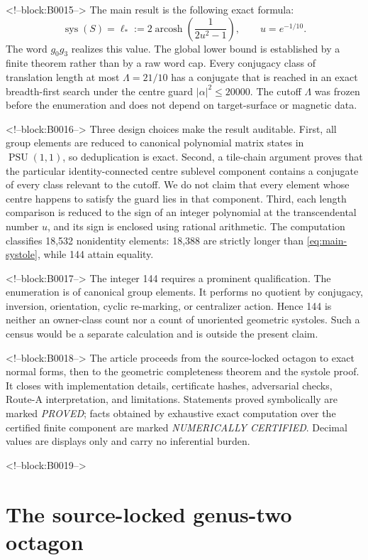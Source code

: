 \documentclass[11pt,a4paper]{article}
\theoremstyle{definition}
\newcommand{\PSU}{\operatorname{PSU}}
\newcommand{\arcosh}{\operatorname{arcosh}}
\newcommand{\sys}{\operatorname{sys}}
\newcommand{\length}{\ell}
\begin{document}
<!--block:B0015-->
The main result is the following exact formula:
\begin{equation}\label{eq:main-systole}
 \sys(S)=\length_*
 :=2\arcosh\!\left(\frac{1}{2u^2-1}\right),
 \qquad u=e^{-1/10}.
\end{equation}
The word \(g_0g_3\) realizes this value.  The global lower bound is established
by a finite theorem rather than by a raw word cap.  Every conjugacy class of
translation length at most
\(\Lambda=21/10\) has a conjugate that is reached in an exact
breadth-first search under the centre guard
\(\lvert\alpha\rvert^2\leq20000\).  The cutoff \(\Lambda\) was frozen before
the enumeration and does not depend on target-surface or magnetic data.

<!--block:B0016-->
Three design choices make the result auditable.  First, all group elements
are reduced to canonical polynomial matrix states in \(\PSU(1,1)\), so
deduplication is exact.  Second, a tile-chain argument proves that the
particular identity-connected centre sublevel component contains a conjugate
of every class relevant to the cutoff.  We do not claim that every element
whose centre happens to satisfy the guard lies in that component.  Third,
each length comparison is reduced to the sign of an integer polynomial at
the transcendental number \(u\), and its sign is enclosed using rational
arithmetic.  The computation classifies 18,532 nonidentity elements: 18,388
are strictly longer than \eqref{eq:main-systole}, while 144 attain equality.

<!--block:B0017-->
The integer 144 requires a prominent qualification.  The enumeration is of
canonical group elements.  It performs no quotient by conjugacy, inversion,
orientation, cyclic re-marking, or centralizer action.  Hence 144 is neither
an owner-class count nor a count of unoriented geometric systoles.  Such a
census would be a separate calculation and is outside the present claim.

<!--block:B0018-->
The article proceeds from the source-locked octagon to exact normal forms,
then to the geometric completeness theorem and the systole proof.  It closes
with implementation details, certificate hashes, adversarial checks, Route-A
interpretation, and limitations.  Statements proved symbolically are marked
\emph{PROVED}; facts obtained by exhaustive exact computation over the
certified finite component are marked \emph{NUMERICALLY CERTIFIED}.  Decimal
values are displays only and carry no inferential burden.

<!--block:B0019-->
\section{The source-locked genus-two octagon}
\label{sec:surface}
\end{document}
